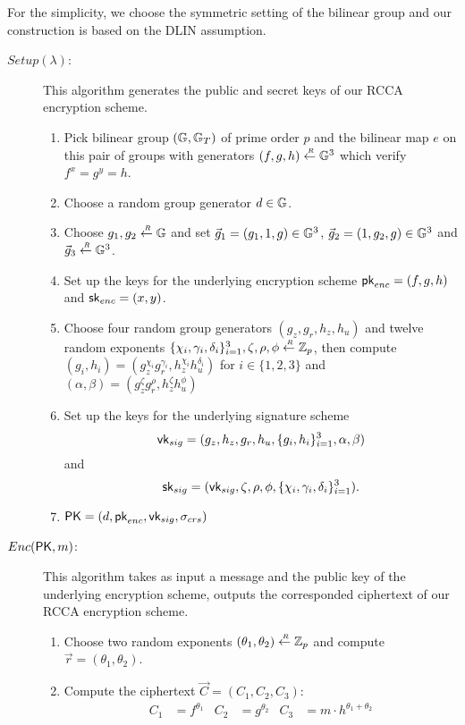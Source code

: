 For the simplicity, we choose the symmetric setting of the bilinear group and our construction is based on the DLIN assumption.

\begin{description}
\item[\boldmath$Setup(\lambda)$:] This algorithm generates the public and secret keys of our RCCA encryption scheme.
  \begin{enumerate}
  \item Pick bilinear group $(\mathbb{G}, \mathbb{G}_T)$ of prime order $p$ and the bilinear map $e$ on this pair of groups with generators $(f,g,h) \stackrel{{\scriptscriptstyle \mkern4mu R}}{\gets} \mathbb{G}^3$ which verify $f^x = g^y = h$.
  \item Choose a random group generator $d \in \mathbb{G}$.
  \item Choose $g_1,g_2 \stackrel{{\scriptscriptstyle \mkern4mu R}}{\gets} \mathbb{G}$ and set $\vec{g}_1 = (g_1,1,g) \in \mathbb{G}^3$, $\vec{g}_2 = (1,g_2,g) \in \mathbb{G}^3$ and $\vec{g}_3 \stackrel{{\scriptscriptstyle \mkern4mu R}}{\gets} \mathbb{G}^3$.
  \item Set up the keys for the underlying encryption scheme $\mathsf{pk}_{enc} = (f,g,h)$ and $\mathsf{sk}_{enc} = (x,y)$.
  \item Choose four random group generators $(g_z, g_r, h_z, h_u)$ and twelve random exponents $\{\chi_i, \gamma_i, \delta_i\}_{i = 1}^3, \zeta, \rho, \phi \stackrel{{\scriptscriptstyle \mkern4mu R}}{\gets} \mathbb{Z}_p$, then compute $(g_i,h_i) = (g_z^{\chi_i}g_r^{\gamma_i}, h_z^{\chi_i}h_u^{\delta_i})$ for $ i \in \{1,2,3\}$ and $(\alpha,\beta) = (g_z^\zeta g_r^\rho, h_z^\zeta h_u^\phi)$
  \item Set up the keys for the underlying signature scheme
    $$\mathsf{vk}_{sig} = (g_z, h_z, g_r, h_u, \{g_i, h_i\}_{i = 1}^3, \alpha ,\beta)$$
    and
    $$\mathsf{sk}_{sig} = (\mathsf{vk}_{sig}, \zeta, \rho, \phi, \{\chi_i, \gamma_i, \delta_i\}_{i = 1}^3).$$
  \item $\mathsf{PK} = (d,\mathsf{pk}_{enc}, \mathsf{vk}_{sig}, \sigma_{crs})$
  \end{enumerate}

\item[\boldmath$Enc(\mathsf{PK},m)$:] This algorithm takes as input a message and the public key of the underlying encryption scheme, outputs the corresponded ciphertext of our RCCA encryption scheme.
  \begin{enumerate}
  \item Choose two random exponents $(\theta_1, \theta_2) \stackrel{{\scriptscriptstyle \mkern4mu R}}{\gets} \mathbb{Z}_p$ and compute $ \vec{r} = (\theta_1, \theta_2)$.
  \item Compute the ciphertext $\vec{C} = (C_1, C_2, C_3)$:
    \begin{align*}
      C_1 &= f^{\theta_1} & C_2 &= g^{\theta_2} & C_3 &= m \cdot h^{\theta_1+\theta_2}
    \end{align*}


\end{enumerate}
\end{description}
